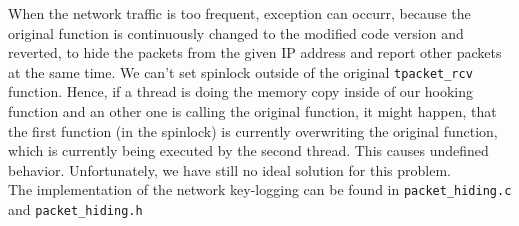 When the network traffic is too frequent, exception can occurr, because the original
function is continuously changed to the modified code version and reverted, 
to hide the packets from the given IP address and report other packets at the
same time. We can't set spinlock outside of the original \texttt{tpacket\_rcv} function. Hence, if a thread is doing the memory copy inside of our hooking function and an other one is calling the original function, it might happen, that the first function (in the spinlock) is currently overwriting the original function, which is currently being executed by the second thread. This causes undefined behavior. 
Unfortunately, we have still no ideal solution for this problem.
\\
The implementation of the network key-logging can be found in 
\verb+packet_hiding.c+ and \verb+packet_hiding.h+\\ 

